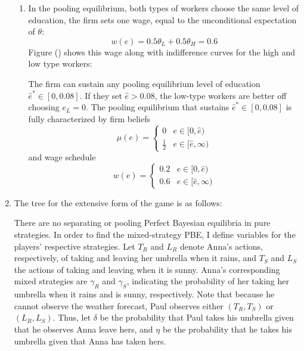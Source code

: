 \documentclass[11pt]{article}
\begin{document}
\begin{enumerate}
\begin{enumerate}
		\item In the pooling equilibrium, both types of workers choose the same level of education, the firm sets one wage, equal to the unconditional expectation of $\theta$:
		\[w(e) = 0.5\theta_L + 0.5\theta_H = 0.6 \]
		Figure () shows this wage along with indifference curves for the high and low type workers:
		
		The firm can sustain any pooling equilibrium level of education $ \hat{e}^*\in[0, 0.08] $. If they set $ \hat{e} > 0.08 $, the low-type workers are better off choosing $ e_L = 0 $. The pooling equilibrium that sustains $ \hat{e}^*\in[0, 0.08] $ is fully characterized by firm beliefs
		\[\mu(e) = \begin{cases}
		0 & e\in[0, \hat{e}) \\ 
		\frac{1}{2} & e\in[\hat{e}, \infty)
		\end{cases}\]
		and wage schedule
		\[w(e) = \begin{cases}
		0.2 & e\in[0, \hat{e}) \\ 
		0.6 & e\in[\hat{e}, \infty)
		\end{cases}\]
	\end{enumerate}

	\item The tree for the extensive form of the game is as follows:
	
	There are no separating or pooling Perfect Bayesian equilibria in pure strategies. In order to find the mixed-strategy PBE, I define variables for the players' respective strategies. Let $ T_R $ and $ L_R $ denote Anna's actions, respectively, of taking and leaving her umbrella when it rains, and $ T_S $ and $ L_S $ the actions of taking and leaving when it is sunny. Anna's corresponding mixed strategies are $ \gamma_R $ and $\gamma_S$, indicating the probability of her taking her umbrella when it rains and is sunny, respectively. Note that because he cannot observe the weather forecast, Paul observes either $ (T_R, T_S) $ or $ (L_R, L_S) $. Thus, let $ \delta $ be the probability that Paul takes his umbrella given that he observes Anna leave hers, and $ \eta $ be the probability that he takes his umbrella given that Anna has taken hers. 
\end{enumerate}
\end{document}
